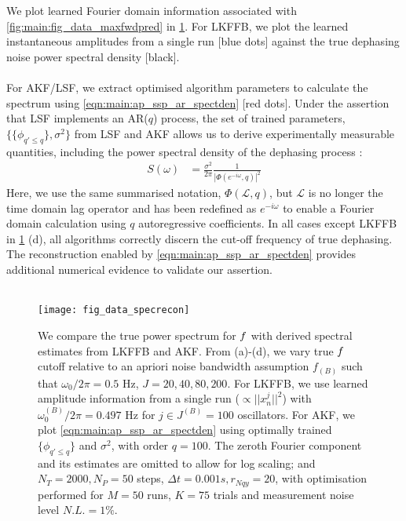 We plot learned Fourier domain information associated with \cref{fig:main:fig_data_maxfwdpred} in \cref{fig:main:fig_data_specrecon}. For LKFFB, we plot the learned instantaneous amplitudes from a single run [blue dots] against the true dephasing noise power spectral density [black]. 
\\
\\
For AKF/LSF, we extract optimised algorithm parameters to calculate the spectrum using \cref{eqn:main:ap_ssp_ar_spectden} [red dots]. Under the assertion that LSF implements an AR($q$) process, the set of trained parameters, $\{  \{\phi_{q' \leq q}\}, \sigma^2\}$ from LSF and AKF allows us to derive experimentally measurable quantities, including the power spectral density of the dephasing process \cite{brockwell1996introduction}:
\begin{align}
S(\omega) & = \frac{\sigma^2}{2 \pi }\frac{1}{|\Phi(e^{-i\omega}, q)|^2} \label{eqn:main:ap_ssp_ar_spectden}  
\end{align}
Here, we use the same summarised notation, $\Phi(\mathcal{L}, q)$, but  $\mathcal{L}$ is no longer the time domain lag operator and has been redefined as $e^{-i\omega}$ to enable a Fourier domain calculation using $q$ autoregressive coefficients. In all cases except LKFFB in \cref{fig:main:fig_data_specrecon} (d), all algorithms correctly discern the cut-off frequency of true dephasing. The reconstruction enabled by \cref{eqn:main:ap_ssp_ar_spectden} provides additional numerical evidence to validate our assertion.  
\\
\\
\begin{figure}
    \texttt{[image: fig\_data\_specrecon]}
    \caption{\label{fig:main:fig_data_specrecon} We compare the true power spectrum for $f$ with derived spectral estimates from LKFFB and AKF. From (a)-(d), we vary true $f$ cutoff relative to an apriori noise bandwidth assumption $f_{(B)}$ such that $\omega_0 / 2\pi = 0.5$ Hz, $J = 20, 40, 80, 200$. For LKFFB, we use learned amplitude information from a single run ($\propto ||x^j_n||^2 $) with $\omega_0^{(B)} / 2\pi = 0.497$ Hz for $j \in J^{(B)} = 100$ oscillators. For AKF, we plot \cref{eqn:main:ap_ssp_ar_spectden} using optimally trained $\{\phi_{q' \leq q}\}$ and $\sigma^2$, with order $q = 100$. The zeroth Fourier component and its estimates are omitted to allow for log scaling; and $N_T = 2000, N_P = 50$ steps, $\Delta t = 0.001s, r_{Nqy}=20$, with optimisation performed for $M=50$ runs, $K=75$ trials and measurement noise level $N.L. = 1\%$.} 
\end{figure} 
